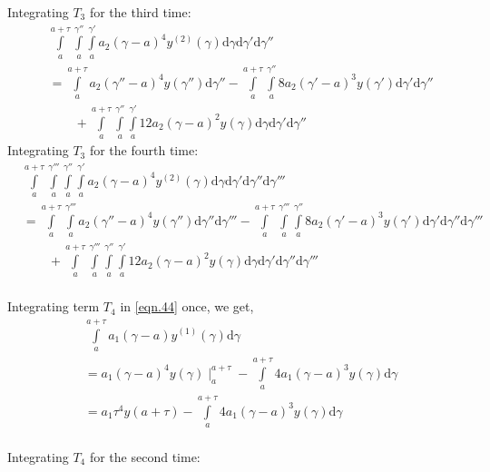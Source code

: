 \documentclass{article}
\begin{document}
Integrating $T_3$ for the third time:
\begin{equation}
\begin{split}
	&\int\limits_{a}^{a+\tau}\int\limits_{a}^{\gamma''}\int\limits_{a}^{\gamma'}a_2(\gamma-a)^{4}y^{(2)}(\gamma)\mathrm{d}\gamma\mathrm{d}\gamma'\mathrm{d}\gamma''\\
	&=\int\limits_{a}^{a+\tau}a_2(\gamma''-a)^4y(\gamma'')\mathrm{d}\gamma'' -\int\limits_{a}^{a+\tau}\int\limits_{a}^{\gamma''}8a_2(\gamma'-a)^3y(\gamma')\mathrm{d}\gamma'\mathrm{d}\gamma''\\
	&\qquad{} + \int\limits_{a}^{a+\tau}\int\limits_{a}^{\gamma''}\int\limits_{a}^{\gamma'}12a_2(\gamma-a)^2y(\gamma)\mathrm{d}\gamma\mathrm{d}\gamma'\mathrm{d}\gamma''
\end{split}
\end{equation}
Integrating $T_3$ for the fourth time:
\begin{equation}
\begin{split}
	&\int\limits_{a}^{a+\tau}\int\limits_{a}^{\gamma'''}\int\limits_{a}^{\gamma''}\int\limits_{a}^{\gamma'}a_2(\gamma-a)^{4}y^{(2)}(\gamma)\mathrm{d}\gamma\mathrm{d}\gamma'\mathrm{d}\gamma''\mathrm{d}\gamma'''\\
	&=\int\limits_{a}^{a+\tau}\int\limits_{a}^{\gamma'''}a_2(\gamma''-a)^4y(\gamma'')\mathrm{d}\gamma''\mathrm{d}\gamma''' -\int\limits_{a}^{a+\tau}\int\limits_{a}^{\gamma'''}\int\limits_{a}^{\gamma''}8a_2(\gamma'-a)^3y(\gamma')\mathrm{d}\gamma'\mathrm{d}\gamma''\mathrm{d}\gamma'''\\
	&\qquad{} + \int\limits_{a}^{a+\tau}\int\limits_{a}^{\gamma'''}\int\limits_{a}^{\gamma''}\int\limits_{a}^{\gamma'}12a_2(\gamma-a)^2y(\gamma)\mathrm{d}\gamma\mathrm{d}\gamma'\mathrm{d}\gamma''\mathrm{d}\gamma'''
\end{split}
\end{equation}
\\Integrating term $T_4$ in \eqref{eqn.44} once, we get,
\begin{equation}
\begin{split}
	&\int\limits_{a}^{a+\tau}a_1(\gamma-a)y^{(1)}(\gamma)\mathrm{d}\gamma\\
	&=a_1(\gamma-a)^4y(\gamma)\mid_{a}^{a+\tau}-\int\limits_{a}^{a+\tau}4a_1(\gamma-a)^{3}y(\gamma)\mathrm{d}\gamma\\
	&=a_1\tau^4y(a+\tau) - \int\limits_{a}^{a+\tau}4a_1(\gamma-a)^3y(\gamma)\mathrm{d}\gamma
\end{split}
\end{equation}
\\Integrating $T_4$ for the second time:
\end{document}
